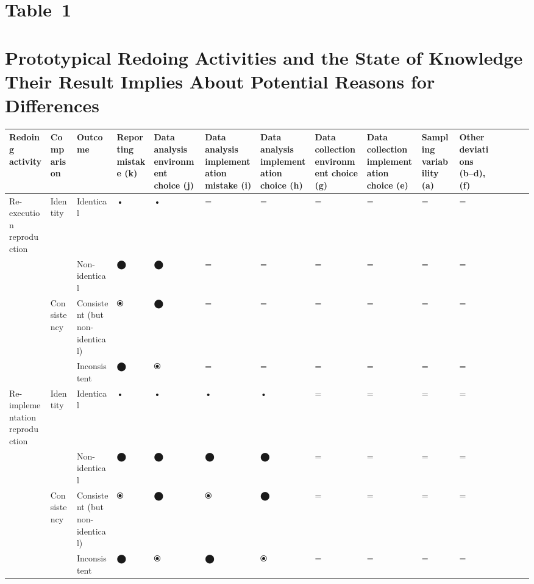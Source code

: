 \documentclass[authordate, empirical]{jote-new-article}
\begin{document}
	\section{\textbf{Table 1}}



	\section{Prototypical Redoing Activities and the State of Knowledge Their Result Implies About Potential Reasons for Differences}

	\begin{table}
		\begin{tabularx}{\linewidth}{@{} l l l l l l l l l l l l l l l @{}}
			\hline \textbf{Redoing activity} & \textbf{Comparison} & \textbf{Outcome} &
			\textbf{Reporting mistake (k)} & \textbf{Data analysis environment choice (j)}
			& \textbf{Data analysis implementation mistake (i)} & \textbf{Data analysis implementation choice (h)}
			& \textbf{Data collection environment choice (g)} & \textbf{Data collection implementation choice (e)}
			& \textbf{Sampling variability (a)} & \textbf{Other deviations (b–d), (f)}
			\\

			\hline Re-execution reproduction & Identity & Identical & • & • & = & = &
			= & = & = & = \\

			\hline  &  & Non-identical & ⬤ & ⬤ & = & = & = & = & = & = \\

			\hline  & Consistency & Consistent (but non-identical) & ⦿ & ⬤ & = & = & =
			& = & = & = \\

			\hline  &  & Inconsistent & ⬤ & ⦿ & = & = & = & = & = & = \\

			\hline Re-implementation reproduction & Identity & Identical & • & • & • &
			• & = & = & = & = \\

			\hline  &  & Non-identical & ⬤ & ⬤ & ⬤ & ⬤ & = & = & = & = \\

			\hline  & Consistency & Consistent (but non-identical) & ⦿ & ⬤ & ⦿ & ⬤ & =
			& = & = & = \\

			\hline  &  & Inconsistent & ⬤ & ⦿ & ⬤ & ⦿ & = & = & = & = \\


\end{tabularx}
\end{table}
\end{document}
